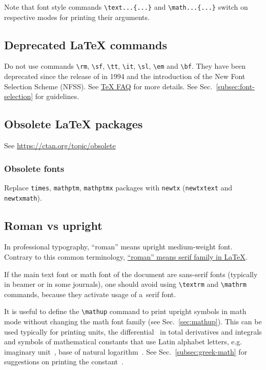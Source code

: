 \documentclass[12pt,a4paper]{article}
\begin{document}
Note that font style commands \verb|\text...{...}| and \verb|\math...{...}| switch on respective modes for printing their arguments.

\subsection{Deprecated \LaTeX{} commands}

Do not use commands \verb_\rm_, \verb_\sf_, \verb_\tt_, \verb_\it_, \verb_\sl_, \verb_\em_ and \verb_\bf_.
They have been deprecated since the release of \LaTeXe{} in 1994 and the introduction of the New Font Selection Scheme (NFSS).
See \href{https://texfaq.org/FAQ-2letterfontcmd}{\TeX{} FAQ} for more details.
See Sec.~\ref{subsec:font-selection} for guidelines.

\subsection{Obsolete \LaTeX{} packages}

See \url{https://ctan.org/topic/obsolete}

\subsubsection{Obsolete fonts}

Replace \texttt{times}, \texttt{mathptm}, \texttt{mathptmx} packages with \texttt{newtx} (\texttt{newtxtext} and \texttt{newtxmath}).

\subsection{Roman vs upright}

In professional typography, ``roman'' means upright medium-weight font.
Contrary to this common terminology, \href{https://tex.stackexchange.com/a/191457}{``roman'' means serif family in \LaTeX{}}.

If the main text font or math font of the document are sans-serif fonts (typically in beamer or in some journals), one should avoid using \verb_\textrm_ and \verb_\mathrm_ commands, because they activate usage of a~serif font.

It is useful to define the \verb_\mathup_ command to print upright symbols in math mode without changing the math font family (see Sec.~\ref{sec:mathup}).
This can be used typically for printing units, the differential~\ml{\dd} in total derivatives and integrals and symbols of mathematical constants that use Latin alphabet letters, e.g. imaginary unit~\ml{\consti}, base of natural logarithm~\ml{\conste}.
See Sec.~\ref{subsec:greek-math} for suggestions on printing the constant~\ml{\constpi}.
\end{document}
